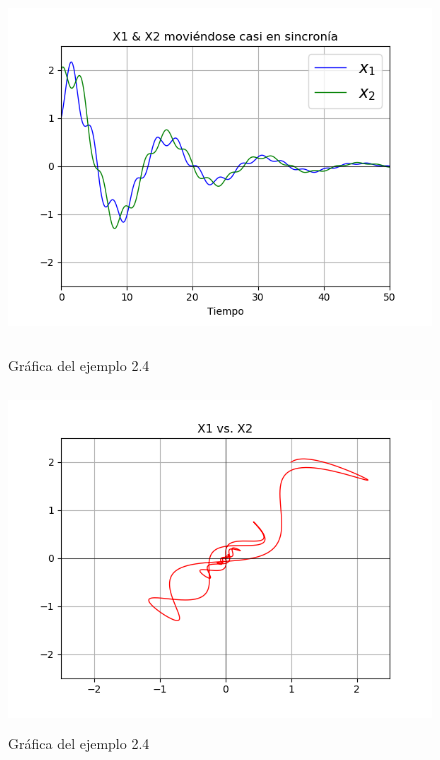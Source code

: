 \begin{figure}[h!]
	\begin{center}
        \includegraphics[height=9cm]{Ejem2_4-GrafE}
        \caption{Gráfica del ejemplo 2.4}

        \includegraphics[height=9cm]{Ejem2_4-GrafF}
        \caption{Gráfica del ejemplo 2.4}
        \label{Ejem2.4-GrafF}
    \end{center}
\end{figure}


